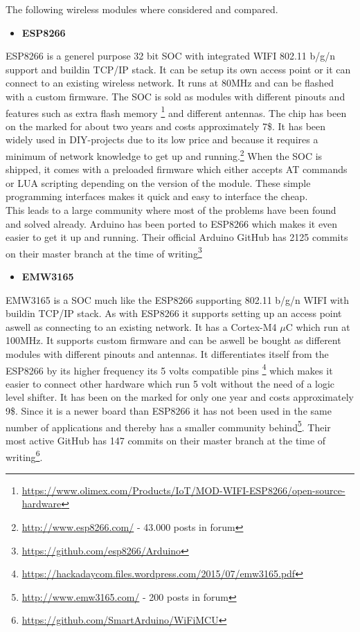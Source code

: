 The following wireless modules where considered and compared.
\begin{itemize}
	\item \textbf{ESP8266}
\end{itemize}

ESP8266 is a generel purpose 32 bit SOC with integrated WIFI 802.11 b/g/n support and buildin TCP/IP stack. It can be setup its own access point or it can connect to an existing wireless network.
It runs at 80MHz and can be flashed with a custom firmware. 
The SOC is sold as modules with different pinouts and features such as extra flash memory \footnote{\url{https://www.olimex.com/Products/IoT/MOD-WIFI-ESP8266/open-source-hardware}} and different antennas.
The chip has been on the marked for about two years and costs approximately 7\$. 
It has been widely used in DIY-projects due to its low price and because it requires a minimum of network knowledge to get up and running.\footnote{\url{http://www.esp8266.com/} - 43.000 posts in forum} When the SOC is shipped, it comes with a preloaded firmware which either accepts AT commands or LUA scripting depending on the version of the module. These simple programming interfaces makes it quick and easy to interface the cheap. \\
This leads to a large community where most of the problems have been found and solved already. Arduino has been ported to ESP8266 which makes it even easier to get it up and running. Their official Arduino GitHub has 2125 commits on their master branch at the time of writing\footnote{\url{https://github.com/esp8266/Arduino}} \\

\begin{itemize}
	\item \textbf{EMW3165}
\end{itemize}
EMW3165 is a SOC much like the ESP8266 supporting 802.11 b/g/n WIFI with buildin TCP/IP stack. As with ESP8266 it supports setting up an access point aswell as connecting to an existing network. It has a Cortex-M4 $\mu$C which run at 100MHz. 
It supports custom firmware and can be aswell be bought as different modules with different pinouts and antennas.
It differentiates itself from the ESP8266 by its higher frequency its 5 volts compatible pins \footnote{\url{https://hackadaycom.files.wordpress.com/2015/07/emw3165.pdf}} which makes it easier to connect other hardware which run 5 volt without the need of a logic level shifter. It has been on the marked for only one year and costs approximately 9\$. Since it is a newer board than ESP8266 it has not been used in the same number of applications and thereby has a smaller community behind\footnote{\url{http://www.emw3165.com/} - 200 posts in forum }. Their most active GitHub has 147 commits on their master branch at the time of writing\footnote{\url{https://github.com/SmartArduino/WiFiMCU}}.

